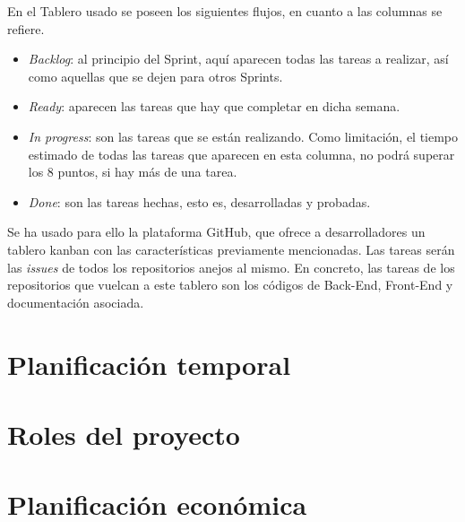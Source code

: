 En el Tablero usado se poseen los siguientes flujos, en cuanto a las columnas se refiere.
\begin{itemize}
    \item \textit{Backlog}: al principio del Sprint, aquí aparecen todas las tareas a realizar, así como aquellas que se dejen para otros Sprints.
    \item \textit{Ready}: aparecen las tareas que hay que completar en dicha semana.
    \item \textit{In progress}: son las tareas que se están realizando. Como limitación, el tiempo estimado de todas las tareas que aparecen en esta columna, no podrá superar los 8 puntos, si hay más de una tarea.
    \item \textit{Done}: son las tareas hechas, esto es, desarrolladas y probadas.
\end{itemize}


Se ha usado para ello la plataforma GitHub, que ofrece a desarrolladores un tablero kanban con las características previamente mencionadas. Las tareas serán las \textit{issues} de todos los repositorios anejos al mismo. En concreto, las tareas de los repositorios que vuelcan a este tablero son los códigos de Back-End, Front-End y documentación asociada.


\section{Planificación temporal}\label{sec:planificacion_temporal}

\section{Roles del proyecto}\label{sec:roles_proyecto}

\section{Planificación económica}\label{sec:planificacion_economica}